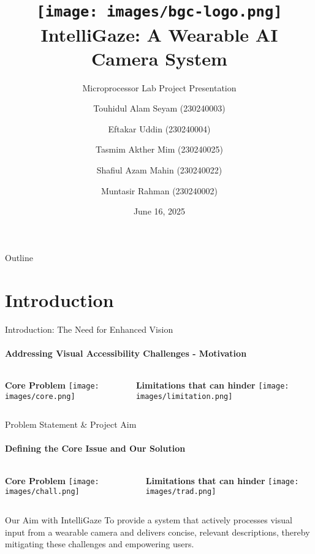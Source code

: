 \documentclass[10pt]{beamer}
\title[IntelliGaze]{\texttt{[image: images/bgc-logo.png]}\\[1em] IntelliGaze: A Wearable AI Camera System}
\subtitle{Microprocessor Lab Project Presentation}
\author[Team Rustacean]{
    Touhidul Alam Seyam (230240003) \and
    Eftakar Uddin (230240004) \and
    Tasmim Akther Mim (230240025) \and
    Shafiul Azam Mahin (230240022) \and
    Muntasir Rahman (230240002)
}
\institute[BGC Trust University]{
    Department of Computer Science and Engineering \\
    BGC Trust University Bangladesh
}
\date{June 16, 2025}
\begin{document}
\begin{frame}
    \titlepage
\end{frame}

\begin{frame}{Outline}
    \tableofcontents
\end{frame}

\section{Introduction} %

\begin{frame}{Introduction: The Need for Enhanced Vision}
    \framesubtitle{Addressing Visual Accessibility Challenges - Motivation}
    \begin{columns}[T]
        \begin{column}{0.48\textwidth} %
            \centering
            \textbf{Core Problem}
            \texttt{[image: images/core.png]} %
        \end{column}
        \begin{column}{0.48\textwidth} %
            \centering
            \textbf{Limitations that can hinder}
            \texttt{[image: images/limitation.png]} %
        \end{column}
    \end{columns}
\end{frame}

\begin{frame}{Problem Statement \& Project Aim}
    \framesubtitle{Defining the Core Issue and Our Solution}
    \begin{columns}[T]
        \begin{column}{0.48\textwidth} %
            \centering
            \textbf{Core Problem}
            \texttt{[image: images/chall.png]} %
        \end{column}
        \begin{column}{0.48\textwidth} %
            \centering
            \textbf{Limitations that can hinder}
            \texttt{[image: images/trad.png]} %
        \end{column}
    \end{columns}
    \vspace{1.5em} %
    \begin{alertblock}{Our Aim with IntelliGaze}
        To provide a system that actively processes visual input from a wearable camera and delivers concise, relevant descriptions, thereby mitigating these challenges and empowering users.
    \end{alertblock}
    \end{frame}
\end{document}
